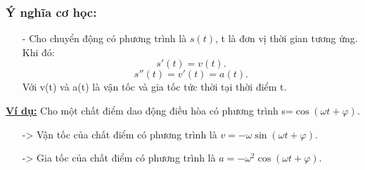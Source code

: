 \documentclass{article}
\begin{document}
\begin{Large}
		\subsubsection{Ý nghĩa cơ học:}
		\begin{itemize}
			\item [-] Cho chuyển động có phương trình là $s(t)$, t là đơn vị thời gian tương ứng. Khi đó: $$s'(t)=v(t).$$ $$s''(t)=v'(t)=a(t).$$ Với v(t) và a(t) là vận tốc và gia tốc tức thời tại thời điểm t.
		\end{itemize}
		\textbf{\underline{Ví dụ:}} Cho một chất điểm dao động điều hòa có phương trình s=$\cos(\omega t+\varphi)$.
		\begin{itemize}
			\item [->]Vận tốc của chất điểm có phương trình là $v=-\omega\sin(\omega t+\varphi)$.
			\item [->]Gia tốc của chất điểm có phương trình là $a=-\omega^2\cos(\omega t+\varphi)$.
		\end{itemize}
	\end{Large}
\end{document}
